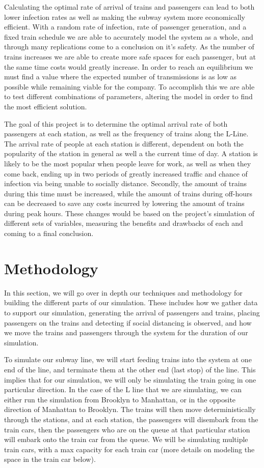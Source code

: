 \documentclass[12pt]{article}
\begin{document}
Calculating the optimal rate of arrival of trains and passengers can lead to both lower infection rates as well as making the subway system more economically efficient. 
With a random rate of infection, rate of passenger generation, and a fixed train schedule we are able to accurately model the system as a whole, and through many replications come to a conclusion on it's safety.
As the number of trains increases we are able to create more safe spaces for each passenger, but at the same time costs would greatly increase. 
In order to reach an equilibrium we must find a value where the expected number of transmissions is as low as possible while remaining viable for the company.
To accomplish this we are able to test different combinations of parameters, altering the model in order to find the most efficient solution. 

The goal of this project is to determine the optimal arrival rate of both passengers at each station, as well as the frequency of trains along the L-Line.
The arrival rate of people at each station is different, dependent on both the popularity of the station in general as well a the current time of day.
A station is likely to be the most popular when people leave for work, as well as when they come back, ending up in two periods of greatly increased traffic and chance of infection via being unable to socially distance.
Secondly, the amount of trains during this time must be increased, while the amount of trains during off-hours can be decreased to save any costs incurred by lowering the amount of trains during peak hours.
These changes would be based on the project's simulation of different sets of variables, measuring the benefits and drawbacks of each and coming to a final conclusion.

\section{Methodology}
In this section, we will go over in depth our techniques and methodology for building the different parts of our simulation.
These includes how we gather data to support our simulation, generating the arrival of passengers and trains, placing passengers on the trains and detecting if social distancing is observed, and how we move the trains and passengers through the system for the duration of our simulation.

To simulate our subway line, we will start feeding trains into the system at one end of the line, and terminate them at the other end (last stop) of the line.
This implies that for our simulation, we will only be simulating the train going in one particular direction.
In the case of the L line that we are simulating, we can either run the simulation from Brooklyn to Manhattan, or in the opposite direction of Manhattan to Brooklyn.
The trains will then move deterministically through the stations, and at each station, the passengers will disembark from the train cars, then the passengers who are on the queue at that particular station will embark onto the train car from the queue. We will be simulating multiple train cars, with a max capacity for each train car (more details on modeling the space in the train car below).
\end{document}
